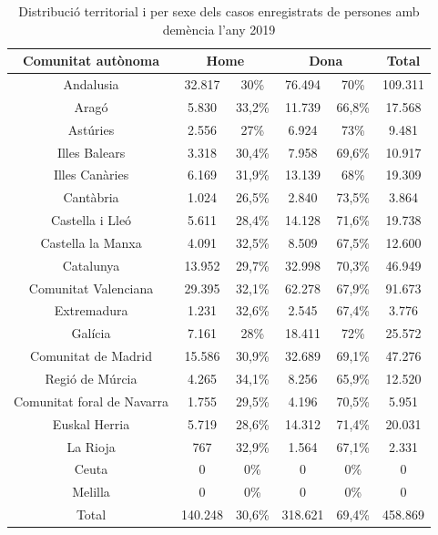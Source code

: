 \documentclass[a4paper,12pt]{article}
\begin{document}
\begin{table}[h]
    \centering
    \begin{tabular}{ |c | c | c | c | c | c | } 
        \hline
        \hline Comunitat autònoma & \multicolumn{2}{|c|}{Home} & \multicolumn{2}{|c|}{Dona} & Total\\
        \hline
        Andalusia & 32.817 & 30\% & 76.494 & 70\% & 109.311\\
        \hline
        Aragó & 5.830 & 33,2\% & 11.739 & 66,8\% & 17.568\\
        \hline
        Astúries & 2.556 & 27\% & 6.924 & 73\% & 9.481\\
        \hline
        Illes Balears & 3.318 & 30,4\% & 7.958 & 69,6\% & 10.917\\
        \hline
        Illes Canàries & 6.169 & 31,9\% & 13.139 & 68\% & 19.309\\
        \hline
        Cantàbria & 1.024 & 26,5\% & 2.840 & 73,5\% & 3.864\\
         \hline
        Castella i Lleó & 5.611 & 28,4\% & 14.128 & 71,6\% & 19.738\\
         \hline
        Castella la Manxa & 4.091 & 32,5\% & 8.509 & 67,5\% & 12.600\\
         \hline
        Catalunya & 13.952 & 29,7\% & 32.998 & 70,3\% & 46.949\\
         \hline
        Comunitat Valenciana & 29.395 & 32,1\% & 62.278 & 67,9\% & 91.673\\
         \hline
        Extremadura & 1.231 & 32,6\% & 2.545 & 67,4\% & 3.776\\
         \hline
        Galícia & 7.161 & 28\% & 18.411 & 72\% & 25.572\\
         \hline
        Comunitat de Madrid & 15.586 & 30,9\% & 32.689 & 69,1\% & 47.276\\
         \hline
        Regió de Múrcia & 4.265 & 34,1\% & 8.256 & 65,9\% & 12.520\\
         \hline
        Comunitat foral de Navarra & 1.755 & 29,5\% & 4.196 & 70,5\% & 5.951\\
         \hline
        Euskal Herria & 5.719 & 28,6\% & 14.312 & 71,4\% & 20.031\\
         \hline
        La Rioja & 767 & 32,9\% & 1.564 & 67,1\% & 2.331\\
         \hline
        Ceuta & 0 & 0\% & 0 & 0\% & 0\\
        \hline
        Melilla & 0 & 0\% & 0 & 0\% & 0\\
        \hline
        Total & 140.248 & 30,6\% & 318.621 & 69,4\% & 458.869\\
        \hline
    \end{tabular}
    \caption{Distribució territorial i per sexe dels casos enregistrats de persones amb demència l'any 2019}
    \label{tab:taula2}
\end{table}
\newpage
\end{document}
